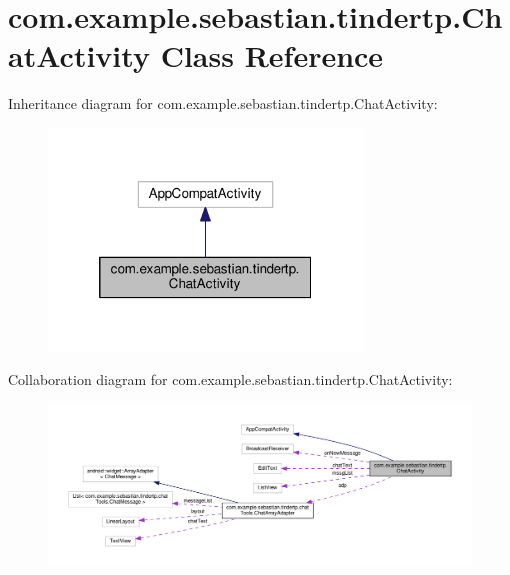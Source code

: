 \hypertarget{classcom_1_1example_1_1sebastian_1_1tindertp_1_1ChatActivity}{}\section{com.\+example.\+sebastian.\+tindertp.\+Chat\+Activity Class Reference}
\label{classcom_1_1example_1_1sebastian_1_1tindertp_1_1ChatActivity}


Inheritance diagram for com.\+example.\+sebastian.\+tindertp.\+Chat\+Activity\+:
\nopagebreak
\begin{figure}[H]
\begin{center}
\leavevmode
\includegraphics[width=236pt]{classcom_1_1example_1_1sebastian_1_1tindertp_1_1ChatActivity__inherit__graph}
\end{center}
\end{figure}


Collaboration diagram for com.\+example.\+sebastian.\+tindertp.\+Chat\+Activity\+:
\nopagebreak
\begin{figure}[H]
\begin{center}
\leavevmode
\includegraphics[width=350pt]{classcom_1_1example_1_1sebastian_1_1tindertp_1_1ChatActivity__coll__graph}
\end{center}
\end{figure}

